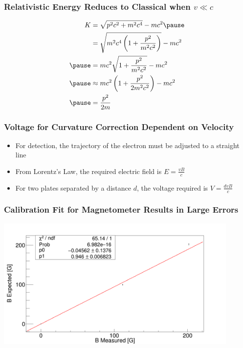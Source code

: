\documentclass{beamer}
\begin{document}
\begin{frame}
  \frametitle{Relativistic Energy Reduces to Classical when $v \ll c$}
  \begin{equation*}
    \begin{aligned}
      K &= \sqrt{p^2 c^2 + m^2 c^4} - mc^2
      \pause
      \\
      &= \sqrt{m^2c^4 \left(1 + \frac{p^2}{m^2 c^2}\right)} - mc^2
      \\
      \pause
      &= mc^2\sqrt{1 + \frac{p^2}{m^2 c^2}} - mc^2
      \\
      \pause 
      &\approx mc^2 \left(1 + \frac{p^2}{2m^2 c^2}\right) - mc^2
      \\
      \pause 
      &= \frac{p^2}{2m}
    \end{aligned}
  \end{equation*}
\end{frame}

\begin{frame}
  \frametitle{Voltage for Curvature Correction Dependent on Velocity}
  \begin{itemize}
    \item For detection, the trajectory of the electron must be adjusted to a straight line
      \pause
    \item From Lorentz's Law, the required electric field is $E = \frac{vB}{c}$
      \pause
    \item For two plates separated by a distance $d$, the voltage required is $V = \frac{dvB}{c}$
  \end{itemize}
\end{frame}

\begin{frame}
  \frametitle{Calibration Fit for Magnetometer Results in Large Errors}
  \includegraphics[width=12cm]{calibration2.png}
\end{frame}
\end{document}
